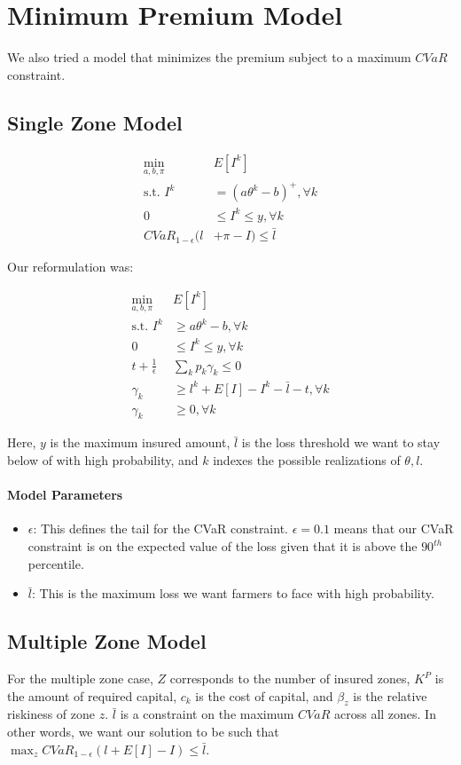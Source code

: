 \documentclass[11pt]{article}
\begin{document}
\section{Minimum Premium Model}
We also tried a model that minimizes the premium subject to a maximum $CVaR$ constraint. 

\subsection*{Single Zone Model}
\begin{align}
    \min_{a,b,\pi} & E[I^k]\\
    \text{s.t.   } I^k &= (a\theta^k -b)^+, \forall k\\
    0 &\leq I^k \leq y, \forall k\\
   CVaR_{1-\epsilon}(l &+ \pi -I) \leq \bar{l}  
\end{align}

Our reformulation was: 

\begin{align}
    \min_{a,b,\pi} & E[I^k]\\
    \text{s.t.   } I^k &\geq a\theta^k -b, \forall k\\
    0 &\leq I^k \leq y, \forall k\\
    t + \frac{1}{\epsilon}&\sum_k p_k \gamma_k \leq 0\\
    \gamma_k &\geq l^k + E[I] -I^k -\bar{l} -t, \forall k\\
    \gamma_k &\geq 0, \forall k
\end{align}

Here, $y$ is the maximum insured amount, $\bar{l}$ is the loss threshold we want to stay below of with high probability, and $k$ indexes the possible realizations of $\theta, l$.
\paragraph*{Model Parameters}
\begin{itemize}
    \item $\epsilon$: This defines the tail for the CVaR constraint. $\epsilon = 0.1$ means that our CVaR constraint is on the expected value of the loss given that it is above the $90^{th}$ percentile. 
    \item $\bar{l}$: This is the maximum loss we want farmers to face with high probability.
\end{itemize}

\subsection*{Multiple Zone Model}
For the multiple zone case, $Z$ corresponds to the number of insured zones, $K^P$ is the amount of required capital, $c_k$ is the cost of capital, and $\beta_z$ is the relative riskiness of zone $z$. $\bar{l}$ is a constraint on the maximum $CVaR$ across all zones. In other words, we want our solution to be such that $\max_z CVaR_{1-\epsilon}(l+E[I]-I) \leq \bar{l}$. 
\end{document}
